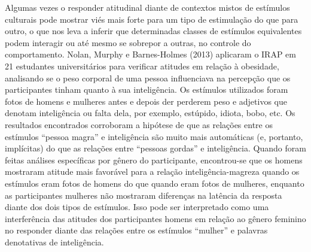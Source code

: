 Algumas vezes o responder atitudinal diante de contextos mistos de estímulos culturais pode mostrar viés mais forte para um tipo de estimulação do que para outro, o que nos leva a inferir que determinadas classes de estímulos equivalentes podem interagir ou até mesmo se sobrepor a outras, no controle do comportamento. Nolan, Murphy e Barnes-Holmes (2013) aplicaram o IRAP em 21 estudantes universitários para verificar atitudes em relação à obesidade, analisando se o peso corporal de uma pessoa influenciava na percepção que os participantes tinham quanto à sua inteligência. Os estímulos utilizados foram fotos de homens e mulheres antes e depois der perderem peso e adjetivos que denotam inteligência ou falta dela, por exemplo, estúpido, idiota, bobo, etc. Os resultados encontrados corroboram a hipótese de que as relações entre os estímulos ``pessoa magra'' e inteligência são muito mais automáticas (e, portanto, implícitas) do que as relações entre ``pessoas gordas'' e inteligência. Quando foram feitas análises específicas por gênero do participante, encontrou-se que os homens mostraram atitude mais favorável para a relação inteligência-magreza quando os estímulos eram fotos de homens do que quando eram fotos de mulheres, enquanto as participantes mulheres não mostraram diferenças na latência da resposta diante dos dois tipos de estímulos. Isso pode ser interpretado como uma interferência das atitudes dos participantes homens em relação ao gênero feminino no responder diante das relações entre os estímulos ``mulher'' e palavras denotativas de inteligência.

